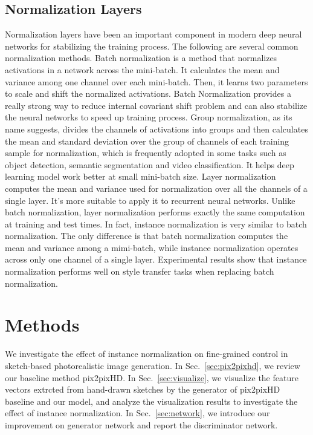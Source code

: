 \documentclass[10pt,twocolumn,letterpaper]{article}
\begin{document}
\subsection{Normalization Layers}
Normalization layers have been an important component in modern deep neural networks for stabilizing the training process. 
The following are several common normalization methods. 
Batch normalization\cite{bn} is a method that normalizes activations in a network across the mini-batch. 
It calculates the mean and variance among one channel over each mini-batch. Then, it learns two parameters to scale and shift the normalized activations.
Batch Normalization provides a really strong way to reduce internal covariant shift problem and can also stabilize the neural networks to speed up training process.
Group normalization\cite{gn}, as its name suggests, divides the channels of activations into groups and then calculates the mean and standard deviation over the group of channels of each training sample for normalization, which is frequently adopted in some tasks such as object detection, semantic segmentation and video classification. It helps deep learning model work better at small mini-batch size.
Layer normalization\cite{ln} computes the mean and variance used for normalization over all the channels of a single layer. It's more suitable to apply it to recurrent neural networks. Unlike batch normalization, layer normalization performs exactly the same computation at training and test times.
In fact, instance normalization\cite{instance_norm} is very similar to batch normalization. 
The only difference is that batch normalization computes the mean and variance among a mimi-batch, while instance normalization operates across only one channel of a single layer. 
Experimental results show that instance normalization performs well on style transfer\cite{carigan,apdrawinggan,stylization,cartoongan,singlegan,transgaga,harmonic} tasks when replacing batch normalization.


\section{Methods}
We investigate the effect of instance normalization on fine-grained control in sketch-based photorealistic image generation.
In Sec.~\ref{sec:pix2pixhd}, we review our baseline method pix2pixHD.
In Sec.~\ref{sec:visualize}, we visualize the feature vectors extrcted from hand-drawn sketches by the generator of pix2pixHD baseline and our model, and analyze the visualization results to investigate the effect of instance normalization.
In Sec.~\ref{sec:network}, we introduce our improvement on generator network and report the discriminator network. 
\end{document}
